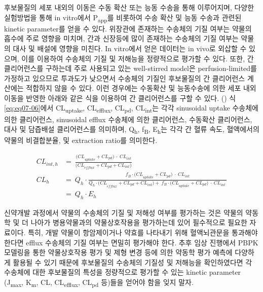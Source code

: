 \documentclass[
  11pt,
  krantz2, a4paper, twoside]{krantz}
\begin{document}
후보물질의 세포 내외의 이동은 수동 확산 또는 능동 수송을 통해
이루어지며, 다양한 실험방법을 통해 in vitro에서 P\textsubscript{app}를 비롯하여 수송
확산 및 능동 수송과 관련된 kinetic parameter를 얻을 수 있다. 위장관에
존재하는 수송체의 기질 여부는 약물의 흡수에 주로 영향을 미치며, 간과
신장등에 많이 존재하는 수송체의 기질 여부는 약물의 대사 및 배설에 영향을
미친다. In vitro에서 얻은 데이터는 in vivo로 외삽할 수 있으며, 이를
이용하여 수송체의 기질 및 저해능을 정량적으로 평가할 수 있다. 또한, 간
클리어런스를 구하는데 주로 사용되고 있는 well-stirred model은
perfusion-limited를 가정하고 있으므로 투과도가 낮으면서 수송체의 기질인
후보물질의 간 클리어런스 계산에는 적합하지 않을 수 있다. 이런 경우에는
수동확산 및 능동수송에 의한 세포 내외 이동을 반영한 아래와 같은 식을
이용하여 간 클리어런스를 구할 수 있다. () 식
\eqref{eq:eq07-06}에서 CL\textsubscript{uptake}, CL\textsubscript{efflux}, CL\textsubscript{pd}, CL\textsubscript{int}는 각각
sinusoidal uptake 수송체에 의한 클리어런스, sinusoidal efflux 수송체에
의한 클리어런스, 수동확산 클리어런스, 대사 및 담즙배설 클리어런스를
의미하며, Q\textsubscript{h}, f\textsubscript{B}, E\textsubscript{h}는 각각 간 혈류 속도, 혈액에서의 약물의
비결합분율, 및 extraction ratio를 의미한다.

\begin{equation}
\begin{split}
{CL}_{int,h} &= \ \frac{{(CL}_{uptake} + {CL}_{pd})\  \cdot \ {CL}_{int}}{{(CL}_{efflux} + {CL}_{pd} + {CL}_{int})} \\
{CL}_{h} &= \ Q_{h} \cdot \frac{f_{B} \cdot {(CL}_{uptake} + {CL}_{pd})\  \cdot \ {CL}_{int}}{{Q_{h} \cdot (CL}_{efflux} + {CL}_{pd} + {CL}_{int}) + \ f_{B} \cdot {(CL}_{uptake} + {CL}_{pd})\  \cdot \ {CL}_{int}\ } \\ 
&= \ Q_{h} \cdot E_{h}
\end{split}
\label{eq:eq07-06} 
\end{equation}

신약개발 과정에서 약물의 수송체의 기질 및 저해성 여부를 평가하는 것은
약물의 약동학 및 더 나아가 병용약물과의 약물상호작용을 평가하는데 있어
필수적으로 필요한 자료이다. 특히, 개발 약물이 항암제이거나 약효를
나타내기 위해 혈액뇌관문을 통과해야 한다면 efflux 수송체의 기질 여부는
면밀히 평가해야 한다. 추후 임상 진행에서 PBPK 모델링을 통한 약물상호작용
평가 및 제형 변경 등에 의한 약동학 평가 예측에 다양하게 활용될 수 있기
때문에 후보물질의 수송체의 기질성 및 저해능을 확인하였다면 각 수송체에
대한 후보물질의 특성을 정량적으로 평가할 수 있는 kinetic parameter
(J\textsubscript{max}, K\textsubscript{m}, CL, CL\textsubscript{efflux}, CL\textsubscript{pd} 등)들을 얻어야 함을 잊지 말자.
\end{document}
